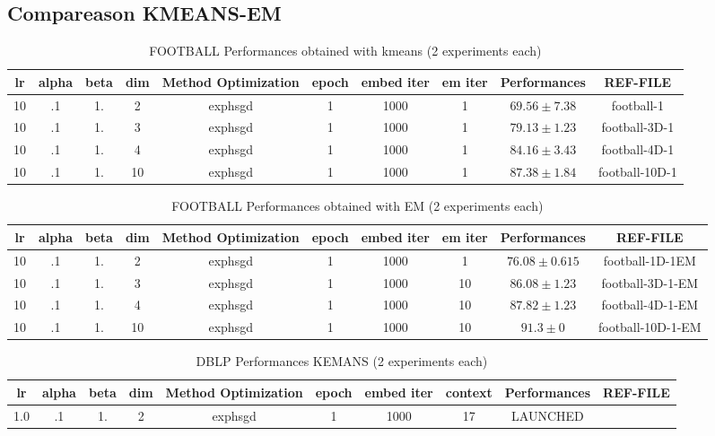 \documentclass{article}
\begin{document}
    \subsection{Compareason KMEANS-EM}
    \begin{table}
        \begin{tabular}{|ccccccccc|c|}
            \hline
            lr & alpha & beta & dim & Method Optimization& epoch & embed iter &em iter & Performances & REF-FILE\\
            \hline
            10 & .1 & 1.& 2 & exphsgd & 1 & 1000 & 1 & $69.56 \pm 7.38$& football-1\\
            10 & .1 & 1.& 3 & exphsgd & 1 & 1000 & 1 & $79.13 \pm 1.23$& football-3D-1\\
            10 & .1 & 1.& 4 & exphsgd & 1 & 1000 & 1 & $84.16 \pm 3.43$& football-4D-1\\
            10 & .1 & 1.& 10 & exphsgd & 1 & 1000 & 1 & $87.38 \pm 1.84$& football-10D-1\\
            \hline
        \end{tabular}
    \label{DBLP-RES}
    \caption{FOOTBALL Performances obtained  with kmeans (2 experiments each)}
\end{table}
    \begin{table}
        \begin{tabular}{|ccccccccc|c|}
            \hline
            lr & alpha & beta & dim & Method Optimization& epoch & embed iter &em iter & Performances & REF-FILE\\
            \hline
            10 & .1 & 1.& 2 & exphsgd & 1 & 1000 & 1 & $76.08 \pm 0.615$& football-1D-1EM\\
            10 & .1 & 1.& 3 & exphsgd & 1 & 1000 & 10 & $86.08 \pm 1.23$& football-3D-1-EM\\
            10 & .1 & 1.& 4 & exphsgd & 1 & 1000 & 10 & $87.82 \pm 1.23$& football-4D-1-EM\\
            10 & .1 & 1.& 10 & exphsgd & 1 & 1000 & 10 & $91.3 \pm 0$& football-10D-1-EM\\
            \hline
        \end{tabular}
    \label{DBLP-RES}
    \caption{FOOTBALL Performances obtained  with EM (2 experiments each)}
\end{table}
\begin{table}
    \begin{tabular}{|ccccccccc|c|}
        \hline
        lr & alpha & beta & dim & Method Optimization& epoch & embed iter & context & Performances & REF-FILE\\
        \hline
        1.0 & .1 & 1.& 2 & exphsgd & 1 & 1000 & 17 & LAUNCHED& \\

        \hline
    \end{tabular}
\label{DBLP-RES}
\caption{DBLP Performances KEMANS (2 experiments each)}
\end{table}
\end{document}
